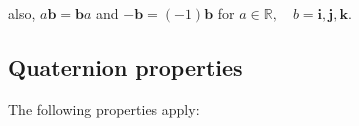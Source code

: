 \begin{table}[h!]
    \centering
    \renewcommand{\arraystretch}{1.25}
    \caption{Quaternion multiplication table}
    \label{tab:quat-mult}
\end{table}

also, $ a \mathbf{b} = \mathbf{b} a $ and
$ \mathbf{-b} = (-1) \mathbf{b} $ for $ a \in \mathbb{R}, \quad b = \mathbf{i}, \mathbf{j}, \mathbf{k} $.


\subsection{Quaternion properties}

The following properties apply:

